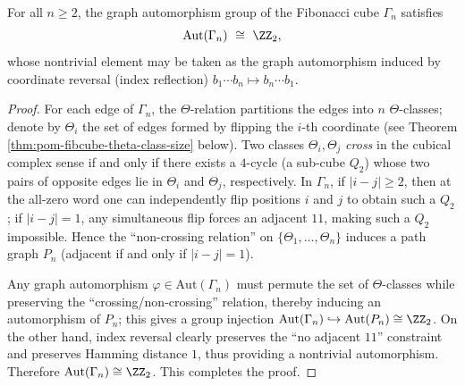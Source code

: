 \begin{theorem}\label{thm:pom-fibcube-aut-z2}
For all \(n\ge 2\), the graph automorphism group of the Fibonacci cube \(\Gamma_n\) satisfies
\[
\mathrm{Aut}(\Gamma_n)\ \cong\ \ZZ_2,
\]
whose nontrivial element may be taken as the graph automorphism induced by coordinate reversal (index reflection) \(b_1\cdots b_n\mapsto b_n\cdots b_1\).
\end{theorem}
\begin{proof}
For each edge of \(\Gamma_n\), the \(\Theta\)-relation partitions the edges into \(n\) \(\Theta\)-classes; denote by \(\Theta_i\) the set of edges formed by flipping the \(i\)-th coordinate (see Theorem \ref{thm:pom-fibcube-theta-class-size} below).
Two classes \(\Theta_i,\Theta_j\) \emph{cross} in the cubical complex sense if and only if there exists a \(4\)-cycle (a sub-cube \(Q_2\)) whose two pairs of opposite edges lie in \(\Theta_i\) and \(\Theta_j\), respectively.
In \(\Gamma_n\), if \(|i-j|\ge 2\), then at the all-zero word one can independently flip positions \(i\) and \(j\) to obtain such a \(Q_2\); if \(|i-j|=1\), any simultaneous flip forces an adjacent \(11\), making such a \(Q_2\) impossible.
Hence the ``non-crossing relation'' on \(\{\Theta_1,\dots,\Theta_n\}\) induces a path graph \(P_n\) (adjacent if and only if \(|i-j|=1\)).
\par
Any graph automorphism \(\varphi\in\mathrm{Aut}(\Gamma_n)\) must permute the set of \(\Theta\)-classes while preserving the ``crossing/non-crossing'' relation,
thereby inducing an automorphism of \(P_n\); this gives a group injection
\(
\mathrm{Aut}(\Gamma_n)\hookrightarrow \mathrm{Aut}(P_n)\cong \ZZ_2
\).
On the other hand, index reversal clearly preserves the ``no adjacent \(11\)'' constraint and preserves Hamming distance \(1\), thus providing a nontrivial automorphism.
Therefore \(\mathrm{Aut}(\Gamma_n)\cong\ZZ_2\). This completes the proof.
\end{proof}

